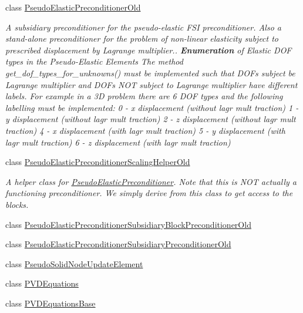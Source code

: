\begin{DoxyCompactItemize}
class \hyperlink{classoomph_1_1PseudoElasticPreconditionerOld}{Pseudo\+Elastic\+Preconditioner\+Old}
\begin{DoxyCompactList}\small\item\em A subsidiary preconditioner for the pseudo-\/elastic F\+SI preconditioner. Also a stand-\/alone preconditioner for the problem of non-\/linear elasticity subject to prescribed displacement by Lagrange multiplier.. {\bfseries Enumeration} of Elastic D\+OF types in the Pseudo-\/\+Elastic Elements The method get\+\_\+dof\+\_\+types\+\_\+for\+\_\+unknowns() must be implemented such that D\+O\+Fs subject be Lagrange multiplier and D\+O\+Fs N\+OT subject to Lagrange multiplier have different labels. For example in a 3D problem there are 6 D\+OF types and the following labelling must be implemented\+: 0 -\/ x displacement (without lagr mult traction) 1 -\/ y displacement (without lagr mult traction) 2 -\/ z displacement (without lagr mult traction) 4 -\/ x displacement (with lagr mult traction) 5 -\/ y displacement (with lagr mult traction) 6 -\/ z displacement (with lagr mult traction) \end{DoxyCompactList}\item 
class \hyperlink{classoomph_1_1PseudoElasticPreconditionerScalingHelperOld}{Pseudo\+Elastic\+Preconditioner\+Scaling\+Helper\+Old}
\begin{DoxyCompactList}\small\item\em A helper class for \hyperlink{classoomph_1_1PseudoElasticPreconditioner}{Pseudo\+Elastic\+Preconditioner}. Note that this is N\+OT actually a functioning preconditioner. We simply derive from this class to get access to the blocks. \end{DoxyCompactList}\item 
class \hyperlink{classoomph_1_1PseudoElasticPreconditionerSubsidiaryBlockPreconditionerOld}{Pseudo\+Elastic\+Preconditioner\+Subsidiary\+Block\+Preconditioner\+Old}
\item 
class \hyperlink{classoomph_1_1PseudoElasticPreconditionerSubsidiaryPreconditionerOld}{Pseudo\+Elastic\+Preconditioner\+Subsidiary\+Preconditioner\+Old}
\item 
class \hyperlink{classoomph_1_1PseudoSolidNodeUpdateElement}{Pseudo\+Solid\+Node\+Update\+Element}
\item 
class \hyperlink{classoomph_1_1PVDEquations}{P\+V\+D\+Equations}
\item 
class \hyperlink{classoomph_1_1PVDEquationsBase}{P\+V\+D\+Equations\+Base}
\item 

\end{DoxyCompactItemize}
